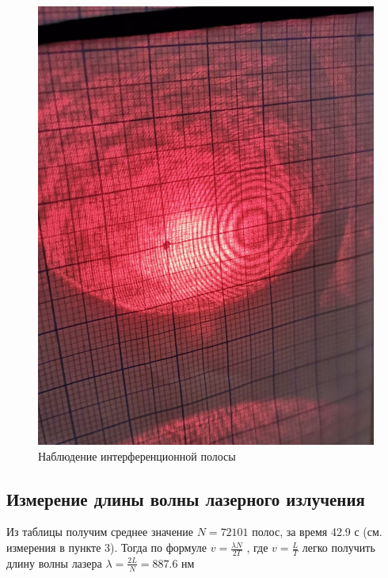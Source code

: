 \documentclass[15pt,a5paper,reqno]{article}
\begin{document}
\begin{figure}[h]
\begin{minipage}[b]{0.4\textwidth}
        \includegraphics[width=\textwidth]{pics/stripes.png}
        \caption{Наблюдение интерференционной полосы}
      \end{minipage}    
    \end{figure}    
    
    
    \begin{table}[h!]
      \centering
      
      \caption{}
      \label{nu1}
    \end{table}



\subsection{Измерение длины волны лазерного излучения}

Из таблицы получим среднее значение $N = 72101$ полос, за время 42.9 с (см. измерения в пункте 3). Тогда по формуле $v = \frac{\lambda N}{2T}$ , где $v = \frac{L}{T}$ легко получить длину волны лазера $\lambda = \frac{2L}{N} = 887.6$ нм
\end{document}
